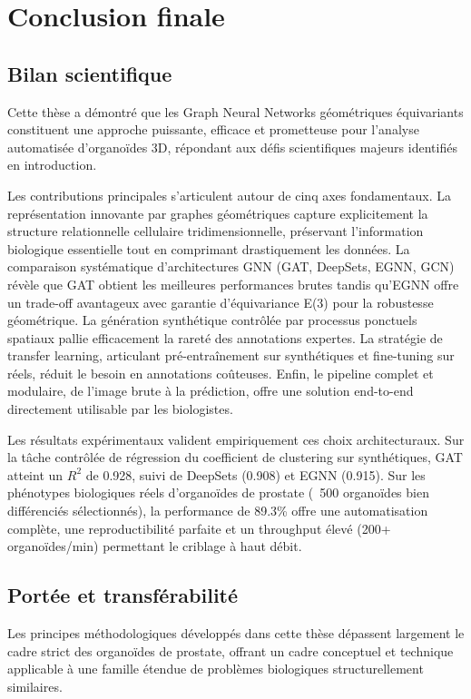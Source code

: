 \section{Conclusion finale}

\subsection{Bilan scientifique}

Cette thèse a démontré que les Graph Neural Networks géométriques équivariants constituent une approche puissante, efficace et prometteuse pour l'analyse automatisée d'organoïdes 3D, répondant aux défis scientifiques majeurs identifiés en introduction.

Les contributions principales s'articulent autour de cinq axes fondamentaux. La représentation innovante par graphes géométriques capture explicitement la structure relationnelle cellulaire tridimensionnelle, préservant l'information biologique essentielle tout en comprimant drastiquement les données. La comparaison systématique d'architectures GNN (GAT, DeepSets, EGNN, GCN) révèle que GAT obtient les meilleures performances brutes tandis qu'EGNN offre un trade-off avantageux avec garantie d'équivariance E(3) pour la robustesse géométrique. La génération synthétique contrôlée par processus ponctuels spatiaux pallie efficacement la rareté des annotations expertes. La stratégie de transfer learning, articulant pré-entraînement sur synthétiques et fine-tuning sur réels, réduit le besoin en annotations coûteuses. Enfin, le pipeline complet et modulaire, de l'image brute à la prédiction, offre une solution end-to-end directement utilisable par les biologistes.

Les résultats expérimentaux valident empiriquement ces choix architecturaux. Sur la tâche contrôlée de régression du coefficient de clustering sur synthétiques, GAT atteint un $R^2$ de 0.928, suivi de DeepSets (0.908) et EGNN (0.915). Sur les phénotypes biologiques réels d'organoïdes de prostate (~500 organoïdes bien différenciés sélectionnés), la performance de 89.3\% offre une automatisation complète, une reproductibilité parfaite et un throughput élevé (200+ organoïdes/min) permettant le criblage à haut débit.

\subsection{Portée et transférabilité}

Les principes méthodologiques développés dans cette thèse dépassent largement le cadre strict des organoïdes de prostate, offrant un cadre conceptuel et technique applicable à une famille étendue de problèmes biologiques structurellement similaires.

